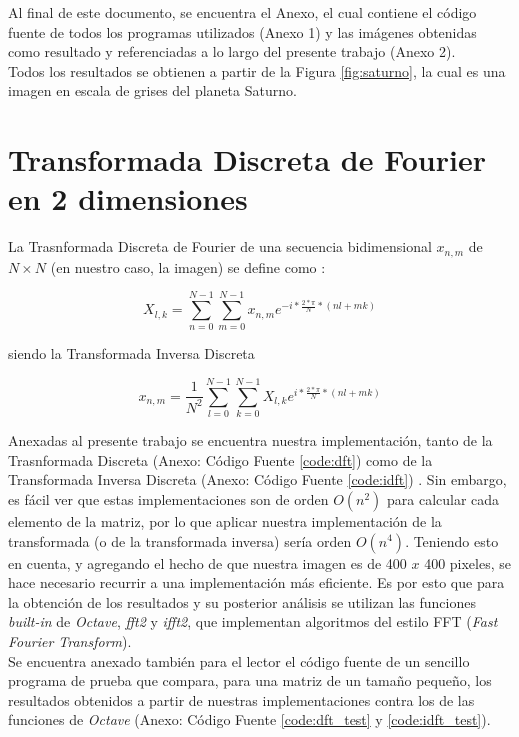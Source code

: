 \documentclass[twocolumn,a4paper,10pt]{article}
\begin{document}
Al final de este documento, se encuentra el Anexo, el cual contiene el c\'odigo fuente de todos los programas utilizados (Anexo 1) y 
las im\'agenes obtenidas como resultado y referenciadas a lo largo del presente trabajo (Anexo 2).\\

Todos los resultados se obtienen a partir de la Figura \ref{fig:saturno}, la cual es una imagen en escala de grises del planeta Saturno. \\

\section{Transformada Discreta de Fourier en 2 dimensiones}
\label{sec:defDFT}
La Trasnformada Discreta de Fourier de una secuencia bidimensional $x_{n,m}$ de $N \times N$ (en nuestro caso, la imagen) 
se define como \cite{Guia2-MNA} \cite{NumericalRecipes}:

\begin{equation}
    X_{l,k} = \sum_{n=0}^{N - 1} \sum_{m=0}^{N - 1} x_{n,m} e^{-i*\frac{2*\pi}{N}*(nl + mk)}
\end{equation}

siendo la Transformada Inversa Discreta

\begin{equation}
    x_{n,m} = \frac{1}{N^2} \sum_{l=0}^{N - 1} \sum_{k=0}^{N - 1} X_{l,k} e^{i*\frac{2*\pi}{N}*(nl + mk)}
\end{equation}

Anexadas al presente trabajo se encuentra nuestra implementaci\'on, tanto de la Trasnformada Discreta (Anexo: C\'odigo Fuente \ref{code:dft}) como de
 la Transformada Inversa Discreta (Anexo: C\'odigo Fuente \ref{code:idft}) . 
Sin embargo, es f\'acil ver que estas 
implementaciones son de orden $O(n^2)$ para calcular cada elemento de la matriz, por lo que aplicar nuestra implementaci\'on de la 
transformada (o de la transformada inversa) ser\'ia orden $O(n^4)$. Teniendo esto en cuenta, y agregando el hecho de que nuestra imagen es de 400 $x$ 400 
pixeles, se hace necesario recurrir a una implementaci\'on m\'as eficiente. Es por esto que para la obtenci\'on de los resultados y su posterior an\'alisis 
se utilizan las funciones \textit{built-in} de \textit{Octave}, \textit{fft2} y \textit{ifft2}, que implementan algoritmos del estilo FFT 
(\textit{Fast Fourier Transform}).\\

Se encuentra anexado también para el lector el c\'odigo fuente de un sencillo programa de prueba que compara, para una matriz de un tamaño pequeño, 
los resultados obtenidos a  partir de nuestras implementaciones contra los de las funciones de \textit{Octave}
(Anexo: C\'odigo Fuente \ref{code:dft_test} y \ref{code:idft_test}). \\
\end{document}
